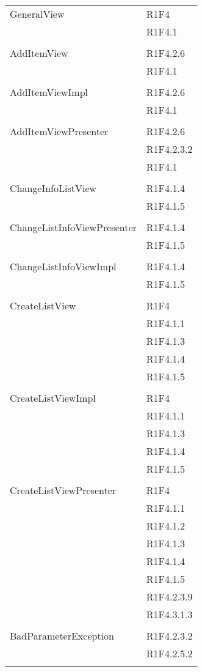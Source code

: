 \begin{center}
\begin{longtable}{|p{7cm}|p{5cm}|}
		GeneralView & R1F4 \\ & R1F4.1 \\ & \\ \hline
		AddItemView & R1F4.2.6 \\ & R1F4.1 \\ & \\ \hline
		AddItemViewImpl & R1F4.2.6 \\ & R1F4.1 \\ & \\ \hline
		AddItemViewPresenter & R1F4.2.6 \\ & R1F4.2.3.2 \\ & R1F4.1 \\ & \\ \hline
		ChangeInfoListView & R1F4.1.4 \\ & R1F4.1.5 \\ & \\ \hline
		ChangeListInfoViewPresenter & R1F4.1.4 \\ & R1F4.1.5 \\ & \\ \hline
		ChangeListInfoViewImpl & R1F4.1.4 \\ & R1F4.1.5 \\ & \\ \hline
		CreateListView & R1F4 \\ & R1F4.1.1 \\ & R1F4.1.3 \\ & R1F4.1.4 \\ & R1F4.1.5 \\ & \\ \hline
		CreateListViewImpl & R1F4 \\ & R1F4.1.1 \\ & R1F4.1.3 \\ & R1F4.1.4 \\ & R1F4.1.5 \\ & \\ \hline
		CreateListViewPresenter & R1F4 \\ & R1F4.1.1 \\ & R1F4.1.2 \\ & R1F4.1.3 \\ & R1F4.1.4 \\ & R1F4.1.5 \\ & R1F4.2.3.9 \\ & R1F4.3.1.3 \\ & \\ \hline
		BadParameterException & R1F4.2.3.2 \\ & R1F4.2.5.2 \\ & \\ \hline

\end{longtable}
\end{center}
